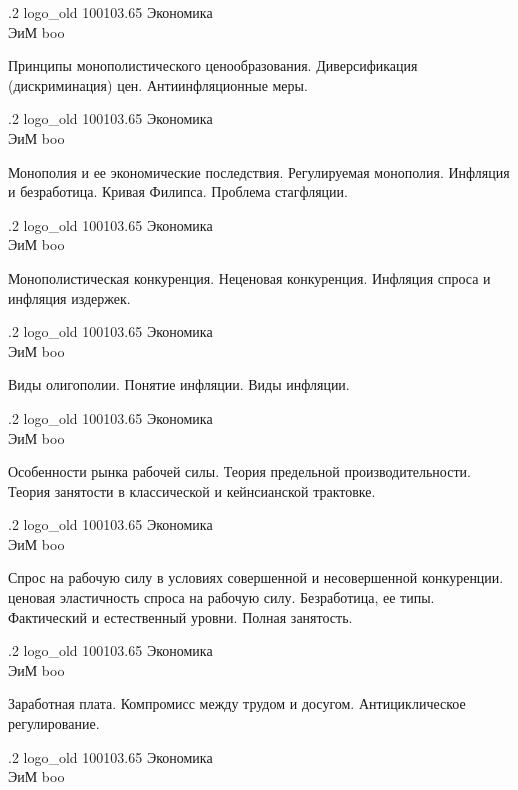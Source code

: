 \documentclass[
	12pt,
	a4paper,
	]
	{article}
\newcommand{\shapkFull}{
	\shapk
		{.2}
		{logo_old}
		{100103.65}
		{Экономика\\}
		{ЭиМ}
		{boo}
}
\begin{document}
\shapkFull
\setcounter{zad}{0}

\z 	Принципы монополистического ценообразования.  Диверсификация  (дискриминация) цен.
 \medskip
\z 	Антиинфляционные меры.
 \medskip

\newpage


\shapkFull
\setcounter{zad}{0}

\z 	Монополия и ее экономические последствия.  Регулируемая монополия.
 \medskip
\z 	Инфляция и безработица.  Кривая Филипса. Проблема стагфляции.
 \medskip

\newpage


\shapkFull
\setcounter{zad}{0}

\z 	Монополистическая конкуренция.  Неценовая конкуренция.
 \medskip
\z 	Инфляция спроса и инфляция издержек.
 \medskip

\newpage


\shapkFull
\setcounter{zad}{0}

\z 	Виды олигополии.
 \medskip
\z 	Понятие инфляции. Виды инфляции.
 \medskip

\newpage


\shapkFull
\setcounter{zad}{0}

\z 	Особенности рынка рабочей силы.  Теория предельной производительности.
 \medskip
\z 	Теория занятости в классической и кейнсианской трактовке. 
 \medskip

\newpage


\shapkFull
\setcounter{zad}{0}

\z 	Спрос на рабочую силу в условиях совершенной и несовершенной конкуренции. ценовая эластичность спроса на рабочую силу.
 \medskip
\z 	Безработица, ее типы. Фактический и естественный уровни. Полная занятость.
 \medskip

\newpage


\shapkFull
\setcounter{zad}{0}

\z 	Заработная плата. Компромисс между трудом и досугом.
 \medskip
\z 	Антициклическое регулирование.
 \medskip

\newpage


\shapkFull
\setcounter{zad}{0}
\end{document}
